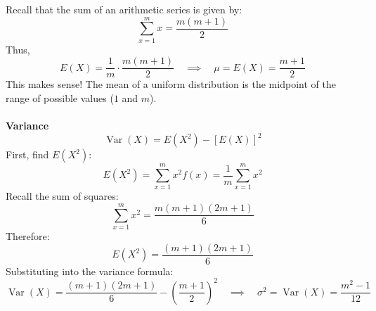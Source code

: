 ﻿\documentclass[12pt]{article}
\begin{document}
Recall that the sum of an arithmetic series is given by:
\[
\sum_{x=1}^{m}x=\frac{m(m+1)}2
\]
Thus,
\[
E(X)=\frac1m\cdot\frac{m(m+1)}2\quad\implies\quad \boxed{\mu=E(X)=\frac{m+1}{2}}
\]
This makes sense! The mean of a uniform distribution is the midpoint of the range of possible values ($1$ and $m$).\\\\
\textbf{Variance}\\
\[
\operatorname{Var}(X)=E(X^2)-[E(X)]^2
\]
First, find \(E(X^2)\):
\[
E(X^2)=\sum_{x=1}^{m}x^2f(x)=\frac1m\sum_{x=1}^{m}x^2
\]
Recall the sum of squares:
\[
\sum_{x=1}^{m}x^2=\frac{m(m+1)(2m+1)}6
\]
Therefore:
\[
E(X^2)=\frac{(m+1)(2m+1)}6
\]
Substituting into the variance formula:
\[
\operatorname{Var}(X)=\frac{(m+1)(2m+1)}6-\left(\frac{m+1}{2}\right)^2\quad\implies\quad \boxed{\sigma^2=\operatorname{Var}(X)=\frac{m^2-1}{12}}
\]
\end{document}
